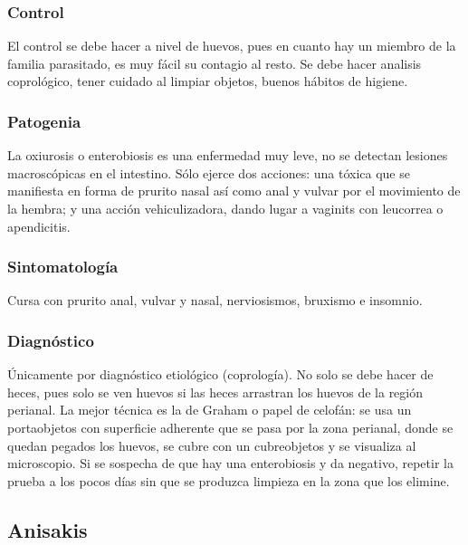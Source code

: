 \subsubsection{Control}
El control se debe hacer a nivel de huevos, pues en cuanto hay un miembro de la familia parasitado, es muy fácil su contagio al resto. Se debe hacer analisis coprológico, tener cuidado al limpiar objetos, buenos hábitos de higiene.
\subsubsection{Patogenia}
La oxiurosis o enterobiosis es una enfermedad muy leve, no se detectan lesiones macroscópicas en el intestino. Sólo ejerce dos acciones: una tóxica que se manifiesta en forma de prurito nasal así como anal y vulvar por el movimiento de la hembra; y una acción vehiculizadora, dando lugar a vaginits con leucorrea o apendicitis.
\subsubsection{Sintomatología}
Cursa con prurito anal, vulvar y nasal, nerviosismos, bruxismo e insomnio.
\subsubsection{Diagnóstico}
Únicamente por diagnóstico etiológico (coprología). No solo se debe hacer de heces, pues solo se ven huevos si las heces arrastran los huevos de la región perianal. La mejor técnica es la de Graham o papel de celofán: se usa un portaobjetos con superficie adherente que se pasa por la zona perianal, donde se quedan pegados los huevos, se cubre con un cubreobjetos y se visualiza al microscopio. Si se sospecha de que hay una enterobiosis y da negativo, repetir la prueba a los pocos días sin que se produzca  limpieza en la zona que los elimine.
\newpage
\subsection{Anisakis}